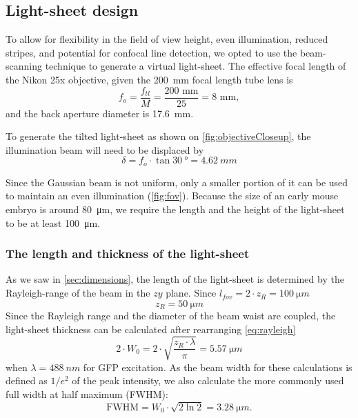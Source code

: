   \subsection{Light-sheet design}
    \label{sec:ls-design}
    To allow for flexibility in the field of view height, even illumination, reduced stripes, and potential for confocal line detection, we opted to use the beam-scanning technique to generate a virtual light-sheet. The effective focal length of the Nikon 25x objective, given the \SI{200}{mm} focal length tube lens is
    \begin{equation}
    f_{o} = \frac{f_{tl}}{M} = \frac{200\text{  mm}}{25} = 8 \text{  mm},
    \end{equation}
    and the back aperture diameter is \SI{17.6}{mm}.
    
    To generate the tilted light-sheet as shown on \autoref{fig:objectiveCloseup}, the illumination beam will need to be displaced by
    \begin{equation}
      \delta = f_o \cdot \tan \SI{30}{\degree} = \SI{4.62}{mm}
    \end{equation}
    
    Since the Gaussian beam is not uniform, only a smaller portion of it can be used to maintain an even illumination (\autoref{fig:fov}). Because the size of an early mouse embryo is around \SI{80}{\micro m}, we require the length and the height of the light-sheet to be at least \SI{100}{\micro m}.
    

    \subsubsection{The length and thickness of the light-sheet}
    
      As we saw in \autoref{sec:dimensions}, the length of the light-sheet is determined by the Rayleigh-range of the beam in the $zy$ plane. Since $l_{fov}=2\cdot z_{R}=\SI{100}{\micro m}$
      \begin{equation}
        z_{R}=\SI{50}{\micro m}
      \end{equation}
      Since the Rayleigh range and the diameter of the beam waist are coupled, the light-sheet thickness can be calculated after rearranging \autoref{eq:rayleigh}
      \begin{equation}
        2\cdot W_{0} = 2\cdot \sqrt{\frac{z_R \cdot \lambda}{\pi}} = \SI{5.57}{\micro m}
      \end{equation}
      when $\lambda=\SI{488}{nm}$ for GFP excitation. As the beam width for these calculations is defined as $1/e^2$ of the peak intensity, we also calculate the more commonly used full width at half maximum (FWHM):
      \begin{equation}
        \mathrm{FWHM} = W_0 \cdot \sqrt{2 \ln 2} = \SI{3.28}{\micro m}.
      \end{equation}
      
